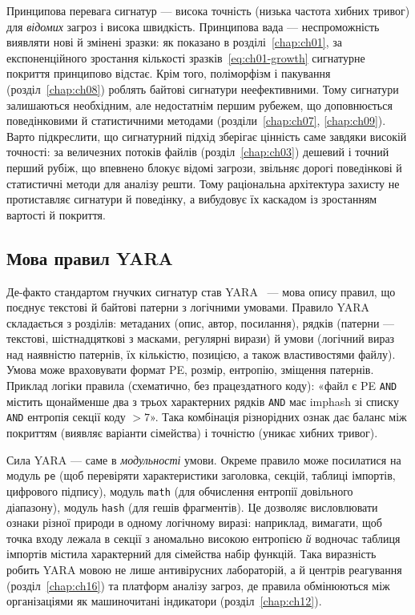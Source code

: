 Принципова перевага сигнатур --- висока точність (низька частота хибних тривог) для \emph{відомих} загроз і висока швидкість. Принципова вада --- неспроможність виявляти нові й змінені зразки: як показано в розділі~\ref{chap:ch01}, за експоненційного зростання кількості зразків~\eqref{eq:ch01-growth} сигнатурне покриття принципово відстає. Крім того, поліморфізм і пакування (розділ~\ref{chap:ch08}) роблять байтові сигнатури неефективними. Тому сигнатури залишаються необхідним, але недостатнім першим рубежем, що доповнюється поведінковими й статистичними методами (розділи~\ref{chap:ch07}, \ref{chap:ch09}). Варто підкреслити, що сигнатурний підхід зберігає цінність саме завдяки високій точності: за величезних потоків файлів (розділ~\ref{chap:ch03}) дешевий і точний перший рубіж, що впевнено блокує відомі загрози, звільняє дорогі поведінкові й статистичні методи для аналізу решти. Тому раціональна архітектура захисту не протиставляє сигнатури й поведінку, а вибудовує їх каскадом із зростанням вартості й покриття.

\subsection{Мова правил YARA}

Де-факто стандартом гнучких сигнатур став YARA~\cite{yara,ch06:yara-doc} --- мова опису правил, що поєднує текстові й байтові патерни з логічними умовами. Правило YARA складається з розділів: метаданих (опис, автор, посилання), рядків (патерни --- текстові, шістнадцяткові з масками, регулярні вирази) й умови (логічний вираз над наявністю патернів, їх кількістю, позицією, а також властивостями файлу). Умова може враховувати формат PE, розмір, ентропію, зміщення патернів. Приклад логіки правила (схематично, без працездатного коду): «файл є PE \texttt{AND} містить щонайменше два з трьох характерних рядків \texttt{AND} має imphash зі списку \texttt{AND} ентропія секції коду $> 7$». Така комбінація різнорідних ознак дає баланс між покриттям (виявляє варіанти сімейства) і точністю (уникає хибних тривог).

Сила YARA --- саме в \emph{модульності} умови. Окреме правило може посилатися на модуль \texttt{pe} (щоб перевіряти характеристики заголовка, секцій, таблиці імпортів, цифрового підпису), модуль \texttt{math} (для обчислення ентропії довільного діапазону), модуль \texttt{hash} (для гешів фрагментів). Це дозволяє висловлювати ознаки різної природи в одному логічному виразі: наприклад, вимагати, щоб точка входу лежала в секції з аномально високою ентропією \emph{й} водночас таблиця імпортів містила характерний для сімейства набір функцій. Така виразність робить YARA мовою не лише антивірусних лабораторій, а й центрів реагування (розділ~\ref{chap:ch16}) та платформ аналізу загроз, де правила обмінюються між організаціями як машиночитані індикатори (розділ~\ref{chap:ch12}).


